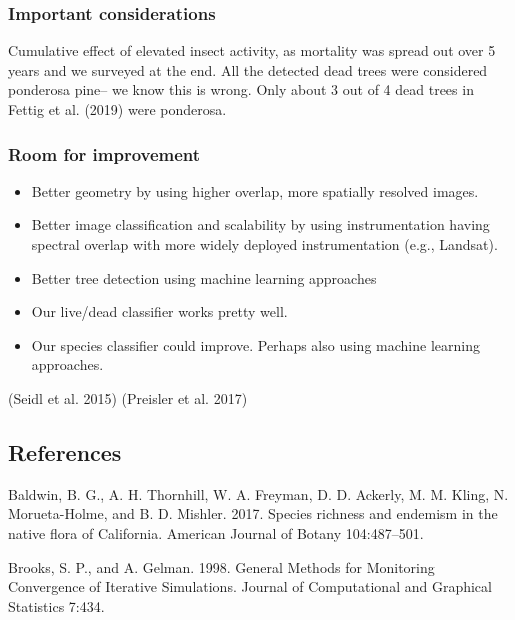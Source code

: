 \documentclass[]{article}
\providecommand{\tightlist}{%
  \setlength{\itemsep}{0pt}\setlength{\parskip}{0pt}}
\begin{document}
\subsubsection{Important considerations}\label{important-considerations}

Cumulative effect of elevated insect activity, as mortality was spread
out over 5 years and we surveyed at the end. All the detected dead trees
were considered ponderosa pine-- we know this is wrong. Only about 3 out
of 4 dead trees in Fettig et al. (2019) were ponderosa.

\subsubsection{Room for improvement}\label{room-for-improvement}

\begin{itemize}
\tightlist
\item
  Better geometry by using higher overlap, more spatially resolved
  images.
\item
  Better image classification and scalability by using instrumentation
  having spectral overlap with more widely deployed instrumentation
  (e.g., Landsat).
\item
  Better tree detection using machine learning approaches
\item
  Our live/dead classifier works pretty well.
\item
  Our species classifier could improve. Perhaps also using machine
  learning approaches.
\end{itemize}

(Seidl et al. 2015) (Preisler et al. 2017)

\subsection*{References}\label{references}

\hypertarget{refs}{}
\hypertarget{ref-baldwin2017a}{}
Baldwin, B. G., A. H. Thornhill, W. A. Freyman, D. D. Ackerly, M. M.
Kling, N. Morueta-Holme, and B. D. Mishler. 2017. Species richness and
endemism in the native flora of California. American Journal of Botany
104:487--501.

\hypertarget{ref-brooks1998}{}
Brooks, S. P., and A. Gelman. 1998. General Methods for Monitoring
Convergence of Iterative Simulations. Journal of Computational and
Graphical Statistics 7:434.
\end{document}
